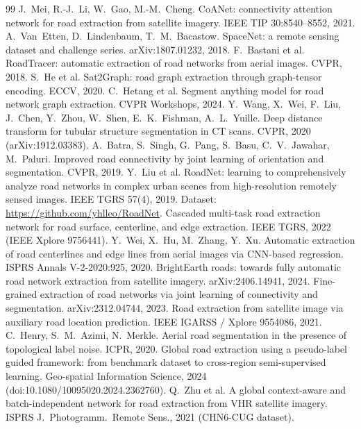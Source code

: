\documentclass[11pt]{article}
\begin{document}
\begin{thebibliography}{99}
 J.~Mei, R.-J.~Li, W.~Gao, M.-M.~Cheng. CoANet: connectivity attention network for road extraction from satellite imagery. IEEE TIP 30:8540--8552, 2021.
 A.~Van~Etten, D.~Lindenbaum, T.~M.~Bacastow. SpaceNet: a remote sensing dataset and challenge series. arXiv:1807.01232, 2018.
 F.~Bastani et al. RoadTracer: automatic extraction of road networks from aerial images. CVPR, 2018.
 S.~He et al. Sat2Graph: road graph extraction through graph-tensor encoding. ECCV, 2020.
 C.~Hetang et al. Segment anything model for road network graph extraction. CVPR Workshops, 2024.
 Y.~Wang, X.~Wei, F.~Liu, J.~Chen, Y.~Zhou, W.~Shen, E.~K.~Fishman, A.~L.~Yuille. Deep distance transform for tubular structure segmentation in CT scans. CVPR, 2020 (arXiv:1912.03383).
 A.~Batra, S.~Singh, G.~Pang, S.~Basu, C.~V.~Jawahar, M.~Paluri. Improved road connectivity by joint learning of orientation and segmentation. CVPR, 2019.
 Y.~Liu et al. RoadNet: learning to comprehensively analyze road networks in complex urban scenes from high-resolution remotely sensed images. IEEE TGRS 57(4), 2019. Dataset: \url{https://github.com/yhlleo/RoadNet}.
 Cascaded multi-task road extraction network for road surface, centerline, and edge extraction. IEEE TGRS, 2022 (IEEE Xplore 9756441).
 Y.~Wei, X.~Hu, M.~Zhang, Y.~Xu. Automatic extraction of road centerlines and edge lines from aerial images via CNN-based regression. ISPRS Annals V-2-2020:925, 2020.
 BrightEarth roads: towards fully automatic road network extraction from satellite imagery. arXiv:2406.14941, 2024.
 Fine-grained extraction of road networks via joint learning of connectivity and segmentation. arXiv:2312.04744, 2023.
 Road extraction from satellite image via auxiliary road location prediction. IEEE IGARSS / Xplore 9554086, 2021.
 C.~Henry, S.~M.~Azimi, N.~Merkle. Aerial road segmentation in the presence of topological label noise. ICPR, 2020.
 Global road extraction using a pseudo-label guided framework: from benchmark dataset to cross-region semi-supervised learning. Geo-spatial Information Science, 2024 (doi:10.1080/10095020.2024.2362760).
 Q.~Zhu et al. A global context-aware and batch-independent network for road extraction from VHR satellite imagery. ISPRS J.\ Photogramm.\ Remote Sens., 2021 (CHN6-CUG dataset).
\end{thebibliography}
\end{document}

